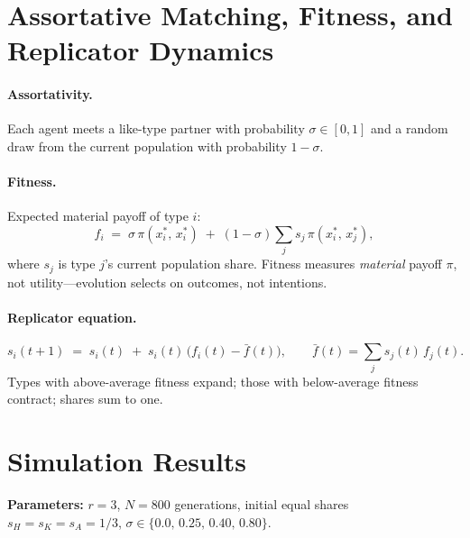 \documentclass[11pt]{article}
\begin{document}
\section{Assortative Matching, Fitness, and Replicator Dynamics}
\label{sec:fitness}

\paragraph{Assortativity.} Each agent meets a like-type partner with probability $\sigma \in [0,1]$ and a random draw from the current population with probability $1-\sigma$.

\paragraph{Fitness.} Expected material payoff of type $i$:
\begin{equation}
    f_i \;=\; \sigma\,\pi(x_i^*,\, x_i^*) \;+\; (1-\sigma)\sum_j s_j\,\pi(x_i^*,\, x_j^*),
    \label{eq:fitness}
\end{equation}
where $s_j$ is type $j$'s current population share. Fitness measures \emph{material} payoff $\pi$, not utility---evolution selects on outcomes, not intentions.

\paragraph{Replicator equation.}
\begin{equation}
    s_i(t+1) \;=\; s_i(t) \;+\; s_i(t)\,\bigl(f_i(t) - \bar{f}(t)\bigr),
    \qquad \bar{f}(t) = \sum_j s_j(t)\,f_j(t).
    \label{eq:replicator}
\end{equation}
Types with above-average fitness expand; those with below-average fitness contract; shares sum to one.

\section{Simulation Results}

\noindent\textbf{Parameters:} $r=3$, $N = 800$ generations, initial equal shares $s_H = s_K = s_A = 1/3$, $\sigma \in \{0.0,\,0.25,\,0.40,\,0.80\}$.
\end{document}
